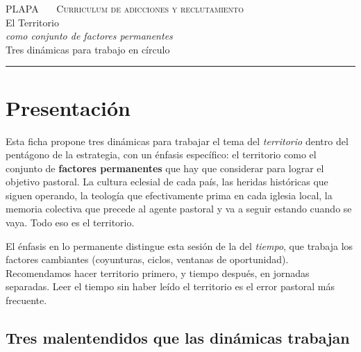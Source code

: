 \documentclass[11pt, a4paper]{article}
\begin{document}

\thispagestyle{plain}
\begin{center}
  \vspace*{1.5em}
  {\color{tenue}\scshape\small PLAPA \ \textbullet\ \ Curriculum de adicciones y reclutamiento}\\
  \vspace{2em}
  {\color{territorioTierra}\Huge El Territorio}\\[0.35em]
  {\color{tinte}\LARGE\itshape como conjunto de factores permanentes}\\
  \vspace{1.4em}
  {\color{tenue}\large Tres dinámicas para trabajo en círculo}\\
  \vspace{0.6em}
  {\color{regla}\rule{0.35\linewidth}{0.5pt}}
\end{center}

\vspace{2em}

\section*{Presentación}

Esta ficha propone tres dinámicas para trabajar el tema del \emph{territorio} dentro del pentágono de la estrategia, con un énfasis específico: el territorio como el conjunto de \textbf{factores permanentes} que hay que considerar para lograr el objetivo pastoral. La cultura eclesial de cada país, las heridas históricas que siguen operando, la teología que efectivamente prima en cada iglesia local, la memoria colectiva que precede al agente pastoral y va a seguir estando cuando se vaya. Todo eso es el territorio.

El énfasis en lo permanente distingue esta sesión de la del \emph{tiempo}, que trabaja los factores cambiantes (coyunturas, ciclos, ventanas de oportunidad). Recomendamos hacer territorio primero, y tiempo después, en jornadas separadas. Leer el tiempo sin haber leído el territorio es el error pastoral más frecuente.

\subsection*{Tres malentendidos que las dinámicas trabajan}
\end{document}
